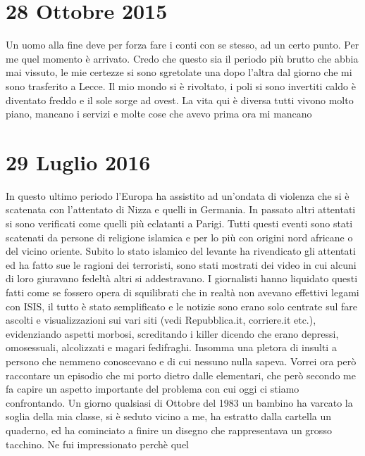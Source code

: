 
\section{28 Ottobre 2015}
Un uomo alla fine deve per forza fare i conti con se stesso, ad un certo punto. Per me quel momento è arrivato. Credo che questo sia il periodo più brutto che abbia mai vissuto, le mie certezze si sono sgretolate una dopo l'altra dal giorno che mi sono trasferito a Lecce. Il mio mondo si è rivoltato, i poli si sono invertiti caldo è diventato freddo e il sole sorge ad ovest.\newline
La vita qui è diversa tutti vivono molto piano, mancano i servizi e
molte cose che avevo prima ora mi mancano

\section{29 Luglio 2016}
In questo ultimo periodo l'Europa ha assistito ad un'ondata di
violenza che si è scatenata con l'attentato di Nizza e quelli in
Germania. In passato altri attentati si sono verificati come quelli
più eclatanti a Parigi.
Tutti questi eventi sono stati scatenati da persone di religione
islamica e per lo più con origini nord africane o del vicino
oriente. Subito lo stato islamico del levante ha rivendicato gli
attentati ed ha fatto sue le ragioni dei terroristi, sono stati
mostrati dei video in cui alcuni di loro giuravano fedeltà altri si
addestravano.\newline
I giornalisti hanno liquidato questi fatti come se fossero opera di
squilibrati che in realtà non avevano effettivi legami con ISIS, il
tutto è stato semplificato e le notizie sono erano solo centrate sul
fare ascolti e visualizzazioni sui vari siti (vedi Repubblica.it,
corriere.it etc.), evidenziando aspetti morbosi, screditando i killer
dicendo che erano depressi, omosessuali, alcolizzati e magari
fedifraghi. Insomma una pletora di insulti a persono che nemmeno
conoscevano e di cui nessuno nulla sapeva.\newline
Vorrei ora però raccontare un episodio che mi porto dietro dalle
elementari, che però secondo me fa capire un aspetto importante del
problema con cui oggi ci stiamo confrontando.\newline
Un giorno qualsiasi di Ottobre del 1983 un bambino ha varcato la
soglia della mia classe, si è seduto vicino a me, ha estratto dalla
cartella un quaderno, ed ha cominciato a finire un disegno che
rappresentava un grosso tacchino. Ne fui impressionato perchè quel
